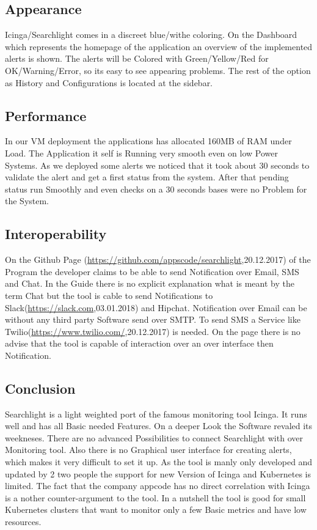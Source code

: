 \subsection{Appearance}
Icinga/Searchlight comes in a  discreet blue/withe coloring. On the Dashboard which represents the homepage of the application an overview of the implemented alerts is shown. The alerts will be Colored with Green/Yellow/Red for OK/Warning/Error, so its easy to see appearing problems. The rest of the option as History and Configurations is located at the sidebar. 
\subsection{Performance}
In our VM deployment the applications has allocated 160MB of RAM under Load. The Application it self is Running very smooth even on low Power Systems. As we deployed some alerts we noticed that it took about 30 seconds to validate the alert and get a first status from the system. After that pending status run Smoothly and even checks on a 30 seconds bases were no Problem for the System.
\subsection{Interoperability}
On the Github Page (\url{https://github.com/appscode/searchlight},20.12.2017) of the Program the developer claims to be able to send Notification over Email, SMS and Chat.
In the Guide there is no explicit explanation what is meant by the term Chat but the tool is cable to send Notifications to Slack(\url{https://slack.com},03.01.2018) and Hipchat. Notification over Email can be without any third party Software send over SMTP. To send SMS a Service like Twilio(\url{https://www.twilio.com/},20.12.2017) is needed.
On the page there is no advise that the tool is capable of interaction over an over interface then Notification. 
\subsection{Conclusion}
Searchlight is a light weighted  port of the famous monitoring tool Icinga. It runs well and has all Basic needed Features. On a deeper Look the Software revaled its weekneses. There are no advanced Possibilities to connect Searchlight with over Monitoring tool. Also there is no Graphical user interface for creating alerts, which makes it very difficult to set it up. As the tool is manly only developed and updated by 2 two people the support for new Version of Icinga and Kubernetes is limited. The fact that the company appcode has no direct correlation with Icinga is a nother counter-argument to the tool. In a nutshell the tool is good for small Kubernetes clusters that want to monitor only a few Basic metrics and have low resources. 

